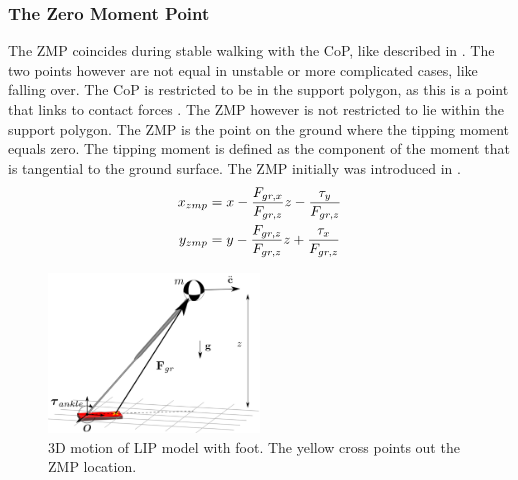 \subsubsection{The Zero Moment Point}
The \ac{ZMP} coincides during stable walking with the \ac{CoP}, like described in \cite{vukobratovic2004zero}. The two points however are not equal in unstable or more complicated cases, like falling over.  The \ac{CoP} is restricted to be in the support polygon, as this is a point that links to contact forces \cite{sardain2004forces}. The \ac{ZMP} however is not restricted to lie within the support polygon. The \ac{ZMP} is the point on the ground where the tipping moment equals zero. The tipping moment is defined as the component of the moment that is tangential to the ground surface. The \ac{ZMP} initially was introduced in \cite{vukobratovic1969contribution}.
\begin{align}
    x_{zmp}&=x-\frac{F_{gr,x}}{F_{gr,z}}z-\frac{\tau_y}{F_{gr,z}}\\
    y_{zmp}&=y-\frac{F_{gr,z}}{F_{gr,z}}z+\frac{\tau_x}{F_{gr,z}}
\end{align}

\begin{figure}[h]
\centering
\includegraphics[width=0.5\textwidth]{STYLESTUFF/3DCoPviz.png}
\caption{\ac{3D} motion of \ac{LIP} model with foot. The yellow cross points out the \ac{ZMP} location.}
\label{fig:3dlipfoot}
\end{figure}

